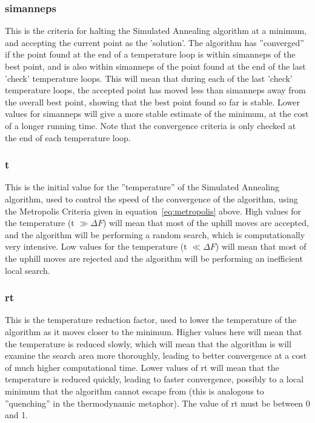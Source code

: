 \documentclass[10pt,twoside]{book}
\begin{document}
\subsubsection{simanneps}
This is the criteria for halting the Simulated Annealing algorithm at a minimum, and accepting the current point as the 'solution'.  The algorithm has ''converged'' if the point found at the end of a temperature loop is within simanneps of the best point, and is also within simanneps of the point found at the end of the last 'check' temperature loops.  This will mean that during each of the last 'check' temperature loops, the accepted point has moved less than simanneps away from the overall best point, showing that the best point found so far is stable.  Lower values for simanneps will give a more stable estimate of the minimum, at the cost of a longer running time.  Note that the convergence criteria is only checked at the end of each temperature loop.

\subsubsection{t}
This is the initial value for the ''temperature'' of the Simulated Annealing algorithm, used to control the speed of the convergence of the algorithm, using the Metropolis Criteria given in equation~\ref{eq:metropolis} above.  High values for the temperature (t $\gg \Delta F$) will mean that most of the uphill moves are accepted, and the algorithm will be performing a random search, which is computationally very intensive.  Low values for the temperature (t $\ll \Delta F$) will mean that most of the uphill moves are rejected and the algorithm will be performing an inefficient local search.

\subsubsection{rt}
This is the temperature reduction factor, used to lower the temperature of the algorithm as it moves closer to the minimum.  Higher values here will mean that the temperature is reduced slowly, which will mean that the algorithm is will examine the search area more thoroughly, leading to better convergence at a cost of much higher computational time.  Lower values of rt will mean that the temperature is reduced quickly, leading to faster convergence, possibly to a local minimum that the algorithm cannot escape from (this is analogous to ''quenching'' in the thermodynamic metaphor).  The value of rt must be between 0 and 1.
\end{document}
